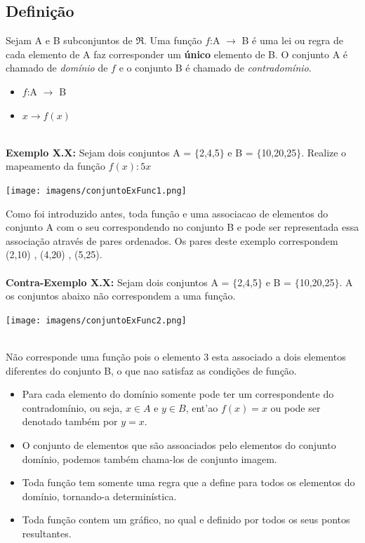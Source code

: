 \documentclass[a4paper,12pt,twoside,BCOR=10mm]{scrbook}
\begin{document}
\begin{titlepage}
\section{Definição}
Sejam A e B subconjuntos de $\Re$. Uma função $f$:A $\rightarrow$ B é uma lei ou regra de cada elemento de A faz corresponder um \textbf{único} elemento de B. O conjunto A é chamado de \textit{domínio} de $f$ e o conjunto B é chamado de \textit{contradomínio}.\\
\begin{itemize}
\item $f$:A $\rightarrow$ B
\item $x \rightarrow f(x) $
\end{itemize}
\\
\textbf{Exemplo X.X:} Sejam dois conjuntos A = $\{$2,4,5$\}$ e B = $\{$10,20,25$\}$. Realize o mapeamento da função $f(x):5x$
\\
\begin{center}
\texttt{[image: imagens/conjuntoExFunc1.png]}
\end{center}
Como foi introduzido antes, toda função e uma associacao de elementos do conjunto A com o seu correspondendo no conjunto B e pode ser representada essa associação através de pares ordenados. Os pares deste exemplo correspondem (2,10) , (4,20) , (5,25).
\\
\\
\textbf{Contra-Exemplo X.X:} Sejam dois conjuntos A = $\{$2,4,5$\}$ e B = $\{$10,20,25$\}$. A os conjuntos abaixo não correspondem a uma função.
\\
\begin{center}
\texttt{[image: imagens/conjuntoExFunc2.png]}
\end{center}
\\
Não corresponde uma função pois o elemento 3 esta associado a dois elementos diferentes do conjunto B, o que nao satisfaz as condições de função.
\\
\begin{itemize}{}
\item Para cada elemento do domínio somente pode ter um correspondente do contradomínio, ou seja, $x \in A$ e $y \in B$, ent'ao $f(x) = x$ ou pode ser denotado também por $ y = x$.
\item O conjunto de elementos que são assoaciados pelo elementos do conjunto domínio, podemos também chama-los de conjunto imagem.
\item Toda função tem somente uma regra que a define para todos os elementos do domínio, tornando-a determinística.
\item Toda função contem um gráfico, no qual e definido por todos os seus pontos resultantes.
\end{itemize}


\end{titlepage}
\end{document}
